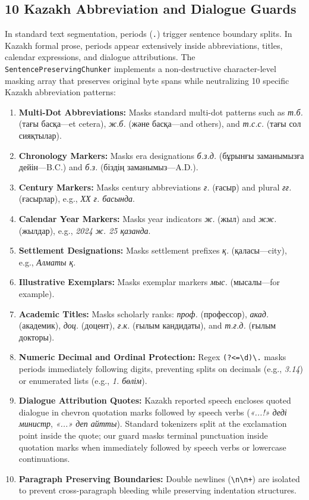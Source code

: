 \subsection{10 Kazakh Abbreviation and Dialogue Guards}
In standard text segmentation, periods (\texttt{.}) trigger sentence boundary splits. In Kazakh formal prose, periods appear extensively inside abbreviations, titles, calendar expressions, and dialogue attributions. The \texttt{SentencePreservingChunker} implements a non-destructive character-level masking array that preserves original byte spans while neutralizing 10 specific Kazakh abbreviation patterns:
\begin{enumerate}
    \item \textbf{Multi-Dot Abbreviations:} Masks standard multi-dot patterns such as \textit{т.б.} (тағы басқа---et cetera), \textit{ж.б.} (және басқа---and others), and \textit{т.с.с.} (тағы сол сияқтылар).
    \item \textbf{Chronology Markers:} Masks era designations \textit{б.з.д.} (бұрынғы заманымызға дейін---B.C.) and \textit{б.з.} (біздің заманымыз---A.D.).
    \item \textbf{Century Markers:} Masks century abbreviations \textit{ғ.} (ғасыр) and plural \textit{ғғ.} (ғасырлар), e.g., \textit{ХХ ғ. басында}.
    \item \textbf{Calendar Year Markers:} Masks year indicators \textit{ж.} (жыл) and \textit{жж.} (жылдар), e.g., \textit{2024 ж. 25 қазанда}.
    \item \textbf{Settlement Designations:} Masks settlement prefixes \textit{қ.} (қаласы---city), e.g., \textit{Алматы қ.}
    \item \textbf{Illustrative Exemplars:} Masks exemplar markers \textit{мыс.} (мысалы---for example).
    \item \textbf{Academic Titles:} Masks scholarly ranks: \textit{проф.} (профессор), \textit{акад.} (академик), \textit{доц.} (доцент), \textit{ғ.к.} (ғылым кандидаты), and \textit{т.ғ.д.} (ғылым докторы).
    \item \textbf{Numeric Decimal and Ordinal Protection:} Regex \texttt{(?<=\textbackslash d)\textbackslash.} masks periods immediately following digits, preventing splits on decimals (e.g., \textit{3.14}) or enumerated lists (e.g., \textit{1. бөлім}).
    \item \textbf{Dialogue Attribution Quotes:} Kazakh reported speech encloses quoted dialogue in chevron quotation marks followed by speech verbs (\textit{«...!» деді министр}, \textit{«...» деп айтты}). Standard tokenizers split at the exclamation point inside the quote; our guard masks terminal punctuation inside quotation marks when immediately followed by speech verbs or lowercase continuations.
    \item \textbf{Paragraph Preserving Boundaries:} Double newlines (\texttt{\textbackslash n\textbackslash n+}) are isolated to prevent cross-paragraph bleeding while preserving indentation structures.
\end{enumerate}

